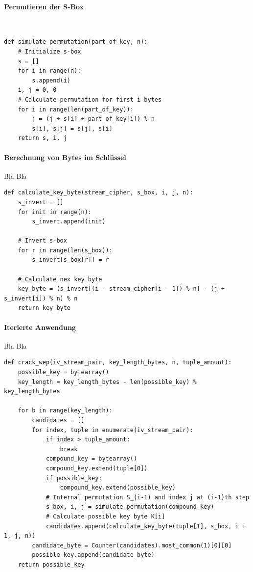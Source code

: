 \documentclass[10pt,a4paper]{article}
\begin{document}
\paragraph{Permutieren der S-Box}\ 
\begin{lstlisting}
def simulate_permutation(part_of_key, n):
    # Initialize s-box
    s = []
    for i in range(n):
        s.append(i)
    i, j = 0, 0
    # Calculate permutation for first i bytes
    for i in range(len(part_of_key)):
        j = (j + s[i] + part_of_key[i]) % n
        s[i], s[j] = s[j], s[i]
    return s, i, j
\end{lstlisting}
\paragraph{Berechnung von Bytes im Schlüssel} Bla Bla
\begin{lstlisting}
def calculate_key_byte(stream_cipher, s_box, i, j, n):
    s_invert = []
    for init in range(n):
        s_invert.append(init)

    # Invert s-box
    for r in range(len(s_box)):
        s_invert[s_box[r]] = r

    # Calculate nex key byte
    key_byte = (s_invert[(i - stream_cipher[i - 1]) % n] - (j + s_invert[i]) % n) % n
    return key_byte
\end{lstlisting}
\paragraph{Iterierte Anwendung} Bla Bla
\begin{lstlisting}
def crack_wep(iv_stream_pair, key_length_bytes, n, tuple_amount):
    possible_key = bytearray()
    key_length = key_length_bytes - len(possible_key) % key_length_bytes

    for b in range(key_length):
        candidates = []
        for index, tuple in enumerate(iv_stream_pair):
            if index > tuple_amount:
                break
            compound_key = bytearray()
            compound_key.extend(tuple[0])
            if possible_key:
                compound_key.extend(possible_key)
            # Internal permutation S_(i-1) and index j at (i-1)th step
            s_box, i, j = simulate_permutation(compound_key)
            # Calculate possible key byte K[i]
            candidates.append(calculate_key_byte(tuple[1], s_box, i + 1, j, n))
        candidate_byte = Counter(candidates).most_common(1)[0][0]
        possible_key.append(candidate_byte)
    return possible_key
\end{lstlisting}
\end{document}
